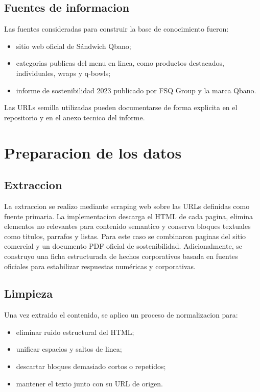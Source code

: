 \documentclass[journal]{IEEEtran}
\begin{document}
\subsection{Fuentes de informacion}
Las fuentes consideradas para construir la base de conocimiento fueron:

\begin{itemize}
\item sitio web oficial de Sándwich Qbano;
\item categorias publicas del menu en linea, como productos destacados, individuales, wraps y q-bowls;
\item informe de sostenibilidad 2023 publicado por FSQ Group y la marca Qbano.
\end{itemize}

Las URLs semilla utilizadas pueden documentarse de forma explicita en el repositorio y en el anexo tecnico del informe.

\section{Preparacion de los datos}
\subsection{Extraccion}
La extraccion se realizo mediante scraping web sobre las URLs definidas como fuente primaria. La implementacion descarga el HTML de cada pagina, elimina elementos no relevantes para contenido semantico y conserva bloques textuales como titulos, parrafos y listas. Para este caso se combinaron paginas del sitio comercial y un documento PDF oficial de sostenibilidad. Adicionalmente, se construyo una ficha estructurada de hechos corporativos basada en fuentes oficiales para estabilizar respuestas numéricas y corporativas.

\subsection{Limpieza}
Una vez extraido el contenido, se aplico un proceso de normalizacion para:

\begin{itemize}
\item eliminar ruido estructural del HTML;
\item unificar espacios y saltos de linea;
\item descartar bloques demasiado cortos o repetidos;
\item mantener el texto junto con su URL de origen.
\end{itemize}
\end{document}
